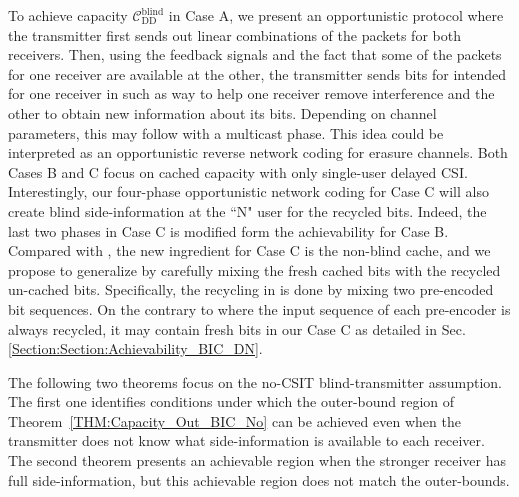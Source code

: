 \documentclass[journal,12pt,draftcls,onecolumn]{IEEEtran}
\begin{document}


To achieve capacity $\mathcal{C}^{\mathrm{blind}}_{\mathrm{DD}}$ in Case A, we present an opportunistic protocol where the transmitter first sends out linear combinations of the packets for both receivers. Then, using the feedback signals and the fact that some of the packets for one receiver are available at the other, the transmitter sends bits for intended for one receiver in such as way to help one receiver remove interference and the other to obtain new information about its bits. Depending on channel parameters, this may follow with a multicast phase. This idea could be interpreted as an opportunistic reverse network coding for erasure channels. Both Cases B and C focus on cached capacity with only single-user delayed CSI.  Interestingly, our four-phase opportunistic network coding for Case C will also create blind side-information at the ``N" user for the recycled bits. Indeed, the last two phases in Case C is modified form the achievability for Case B. Compared with \cite{lin2019no}, the new ingredient  for Case C is the non-blind cache, and we propose to generalize \cite{lin2019no}
by carefully mixing the fresh cached bits with the recycled un-cached bits. Specifically,  the recycling in \cite{lin2019no} is done by mixing two pre-encoded bit sequences. On the contrary to \cite{lin2019no} where the input sequence of each pre-encoder is always recycled, it may contain fresh bits in our Case C as detailed in Sec. \ref{Section:Section:Achievability_BIC_DN}.


The following two theorems focus on the no-CSIT blind-transmitter assumption. The first one identifies conditions under which the outer-bound region of Theorem~\ref{THM:Capacity_Out_BIC_No} can be achieved even when the transmitter does not know what side-information is available to each receiver. The second theorem presents an achievable region when the stronger receiver has full side-information, but this achievable region does not match the outer-bounds.
\end{document}

